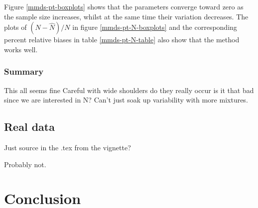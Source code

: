 Figure \ref{mmds-pt-boxplots} shows that the parameters converge toward zero as the sample size increases, whilst at the same time their variation decreases. The plots of $(N-\hat{N})/N$ in figure \ref{mmds-pt-N-boxplots} and the corresponding percent relative biases in table \ref{mmds-pt-N-table} also show that the method works well.

\subsubsection{Summary}

   This all seems fine
   Careful with wide shoulders
      do they really occur
      is it that bad since we are interested in N?
   Can't just soak up variability with more mixtures.

\subsection{Real data}

Just source in the .tex from the vignette?

Probably not.


\section{Conclusion}


%
%

